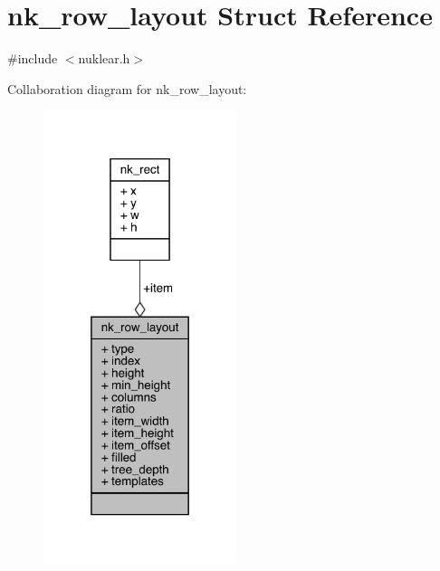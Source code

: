 \hypertarget{structnk__row__layout}{}\section{nk\+\_\+row\+\_\+layout Struct Reference}
\label{structnk__row__layout}


{\ttfamily \#include $<$nuklear.\+h$>$}



Collaboration diagram for nk\+\_\+row\+\_\+layout\+:
\nopagebreak
\begin{figure}[H]
\begin{center}
\leavevmode
\includegraphics[width=160pt]{structnk__row__layout__coll__graph}
\end{center}
\end{figure}
